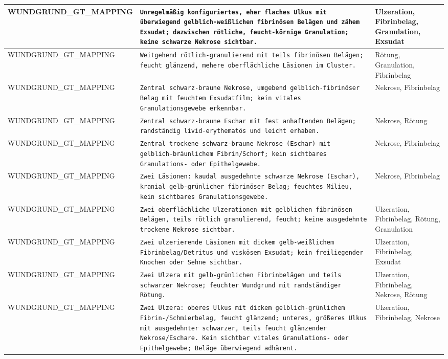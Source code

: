\begin{longtable}{|p{3.5cm}|p{5cm}|p{6.5cm}|}
WUNDGRUND\_GT\_MAPPING & \texttt{Unregelmäßig konfiguriertes, eher flaches Ulkus mit überwiegend gelblich-weißlichen fibrinösen Belägen und zähem Exsudat; dazwischen rötliche, feucht-körnige Granulation; keine schwarze Nekrose sichtbar.} & Ulzeration, Fibrinbelag, Granulation, Exsudat \\ \hline
WUNDGRUND\_GT\_MAPPING & \texttt{Weitgehend rötlich-granulierend mit teils fibrinösen Belägen; feucht glänzend, mehere oberflächliche Läsionen im Cluster.} & Rötung, Granulation, Fibrinbelag \\ \hline
WUNDGRUND\_GT\_MAPPING & \texttt{Zentral schwarz-braune Nekrose, umgebend gelblich-fibrinöser Belag mit feuchtem Exsudatfilm; kein vitales Granulationsgewebe erkennbar.} & Nekrose, Fibrinbelag \\ \hline
WUNDGRUND\_GT\_MAPPING & \texttt{Zentral schwarz-braune Eschar mit fest anhaftenden Belägen; randständig livid-erythematös und leicht erhaben.} & Nekrose, Rötung \\ \hline
WUNDGRUND\_GT\_MAPPING & \texttt{Zentral trockene schwarz‑braune Nekrose (Eschar) mit gelblich‑bräunlichem Fibrin/Schorf; kein sichtbares Granulations- oder Epithelgewebe.} & Nekrose, Fibrinbelag \\ \hline
WUNDGRUND\_GT\_MAPPING & \texttt{Zwei Läsionen: kaudal ausgedehnte schwarze Nekrose (Eschar), kranial gelb-grünlicher fibrinöser Belag; feuchtes Milieu, kein sichtbares Granulationsgewebe.} & Nekrose, Fibrinbelag \\ \hline
WUNDGRUND\_GT\_MAPPING & \texttt{Zwei oberflächliche Ulzerationen mit gelblichen fibrinösen Belägen, teils rötlich granulierend, feucht; keine ausgedehnte trockene Nekrose sichtbar.} & Ulzeration, Fibrinbelag, Rötung, Granulation \\ \hline
WUNDGRUND\_GT\_MAPPING & \texttt{Zwei ulzerierende Läsionen mit dickem gelb-weißlichem Fibrinbelag/Detritus und viskösem Exsudat; kein freiliegender Knochen oder Sehne sichtbar.} & Ulzeration, Fibrinbelag, Exsudat \\ \hline
WUNDGRUND\_GT\_MAPPING & \texttt{Zwei Ulzera mit gelb-grünlichen Fibrinbelägen und teils schwarzer Nekrose; feuchter Wundgrund mit randständiger Rötung.} & Ulzeration, Fibrinbelag, Nekrose, Rötung \\ \hline
WUNDGRUND\_GT\_MAPPING & \texttt{Zwei Ulzera: oberes Ulkus mit dickem gelblich-grünlichem Fibrin-/Schmierbelag, feucht glänzend; unteres, größeres Ulkus mit ausgedehnter schwarzer, teils feucht glänzender Nekrose/Eschare. Kein sichtbar vitales Granulations- oder Epithelgewebe; Beläge überwiegend adhärent.} & Ulzeration, Fibrinbelag, Nekrose \\ \hline

\end{longtable}

